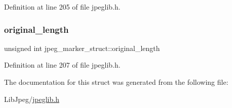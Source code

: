 Definition at line 205 of file jpeglib.\+h.

\mbox{\label{structjpeg__marker__struct_a3b17d58a17fa6be8560b697da814dfd3}} 
\subsubsection{\texorpdfstring{original\_length}{original\_length}}
{\footnotesize\ttfamily unsigned int jpeg\+\_\+marker\+\_\+struct\+::original\+\_\+length}



Definition at line 207 of file jpeglib.\+h.



The documentation for this struct was generated from the following file\+:\begin{DoxyCompactItemize}
\item 
Lib\+Jpeg/\mbox{\hyperlink{jpeglib_8h}{jpeglib.\+h}}\end{DoxyCompactItemize}
